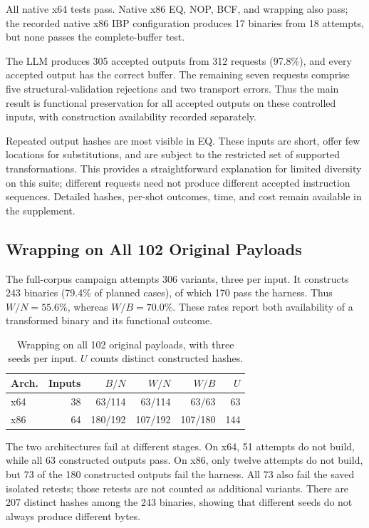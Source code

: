 All native x64 tests pass. Native x86 EQ, NOP, BCF, and wrapping also
pass; the recorded native x86 IBP configuration produces 17 binaries from
18 attempts, but none passes the complete-buffer test.

The LLM produces 305 accepted outputs from 312 requests (97.8\%), and
every accepted output has the correct buffer. The remaining seven requests
comprise five structural-validation rejections and two transport errors.
Thus the main result is functional preservation for all accepted outputs
on these controlled inputs, with construction availability recorded separately.

Repeated output hashes are most visible in EQ. These inputs are short,
offer few locations for substitutions, and are subject to the restricted
set of supported transformations. This provides a straightforward
explanation for limited diversity on this suite; different requests need
not produce different accepted instruction sequences. Detailed hashes,
per-shot outcomes, time, and cost remain available in the supplement.

\subsection{Wrapping on All 102 Original Payloads}
The full-corpus campaign attempts 306 variants, three per input. It constructs
243 binaries (79.4\% of planned cases), of which 170 pass the harness.
Thus $W/N=55.6$\%, whereas $W/B=70.0$\%. These rates report both availability of a transformed binary and
its functional outcome.


\begin{table}[t]
\caption{Wrapping on all 102 original payloads, with three seeds per input.
$U$ counts distinct constructed hashes.}
\label{tab:new_wrap_full}
\centering\small
\begin{tabular}{@{}lrrrrr@{}}
\toprule
Arch. & Inputs & $B/N$ & $W/N$ & $W/B$ & $U$ \\
\midrule
x64 & 38 & 63/114 & 63/114 & 63/63 & 63 \\
x86 & 64 & 180/192 & 107/192 & 107/180 & 144 \\
\bottomrule
\end{tabular}
\end{table}


The two architectures fail at different stages. On x64, 51 attempts do
not build, while all 63 constructed outputs pass. On x86, only twelve
attempts do not build, but 73 of the 180 constructed outputs fail the
harness. All 73 also fail the saved isolated retests; those retests are
not counted as additional variants. There are 207 distinct hashes among
the 243 binaries, showing that different seeds do not always produce
different bytes.


